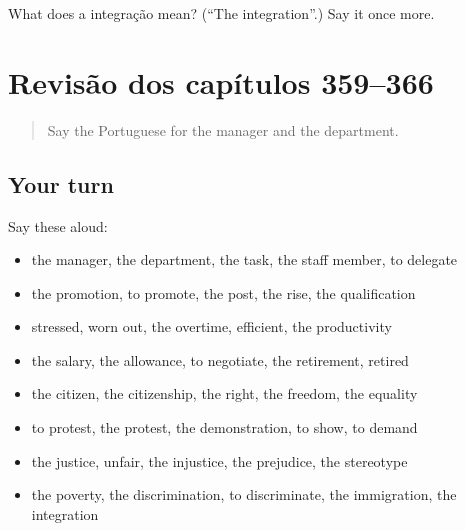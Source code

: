 \begin{tcolorbox}[breakable,colback=teal!4,colframe=teal!35!black,title={Before you move on}]
What does a integração mean? (\textquotedblleft{}The integration\textquotedblright{}.) Say it once more.
\end{tcolorbox}
\section[(dialogue)]{Revisão dos capítulos 359–366}

\label{lesson:PT-R366-revisao-359-366}



\begin{quote}
Say the Portuguese for the manager and the department.
\end{quote}

\subsection*{Your turn}
Say these aloud:

\begin{itemize}
\raggedright
  \item the manager, the department, the task, the staff member, to delegate
  \item the promotion, to promote, the post, the rise, the qualification
  \item stressed, worn out, the overtime, efficient, the productivity
  \item the salary, the allowance, to negotiate, the retirement, retired
  \item the citizen, the citizenship, the right, the freedom, the equality
  \item to protest, the protest, the demonstration, to show, to demand
  \item the justice, unfair, the injustice, the prejudice, the stereotype
  \item the poverty, the discrimination, to discriminate, the immigration, the integration
\end{itemize}

